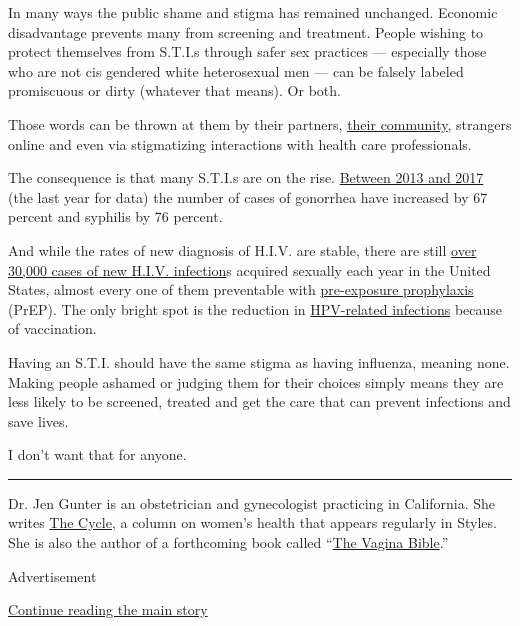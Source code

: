 In many ways the public shame and stigma has remained unchanged.
Economic disadvantage prevents many from screening and treatment. People
wishing to protect themselves from S.T.I.s through safer sex practices
--- especially those who are not cis gendered white heterosexual men ---
can be falsely labeled promiscuous or dirty (whatever that means). Or
both.

Those words can be thrown at them by their partners,
\href{https://www.ncbi.nlm.nih.gov/pmc/articles/PMC4566537/}{their
community}, strangers online and even via stigmatizing interactions with
health care professionals.

The consequence is that many S.T.I.s are on the rise.
\href{https://www.cdc.gov/media/releases/2018/p0828-increases-in-stds.html}{Between
2013 and 2017} (the last year for data) the number of cases of gonorrhea
have increased by 67 percent and syphilis by 76 percent.

And while the rates of new diagnosis of H.I.V. are stable, there are
still
\href{https://www.cdc.gov/hiv/statistics/overview/ataglance.html}{over
30,000 cases of new H.I.V. infection}s acquired sexually each year in
the United States, almost every one of them preventable with
\href{https://www.cdc.gov/hiv/risk/prep/index.html}{pre-exposure
prophylaxis} (PrEP). The only bright spot is the reduction in
\href{https://www.nytimes3xbfgragh.onion/2019/06/27/health/hpv-vaccine-warts-cancer.html}{HPV-related
infections} because of vaccination.

Having an S.T.I. should have the same stigma as having influenza,
meaning none. Making people ashamed or judging them for their choices
simply means they are less likely to be screened, treated and get the
care that can prevent infections and save lives.

I don't want that for anyone.

\begin{center}\rule{0.5\linewidth}{\linethickness}\end{center}

Dr. Jen Gunter is an obstetrician and gynecologist practicing in
California. She writes
\href{https://www.nytimes3xbfgragh.onion/column/the-cycle}{The Cycle}, a
column on women's health that appears regularly in Styles. She is also
the author of a forthcoming book called
``\href{https://www.kensingtonbooks.com/book.aspx/37809}{The Vagina
Bible}.''

Advertisement

\protect\hyperlink{after-bottom}{Continue reading the main story}

